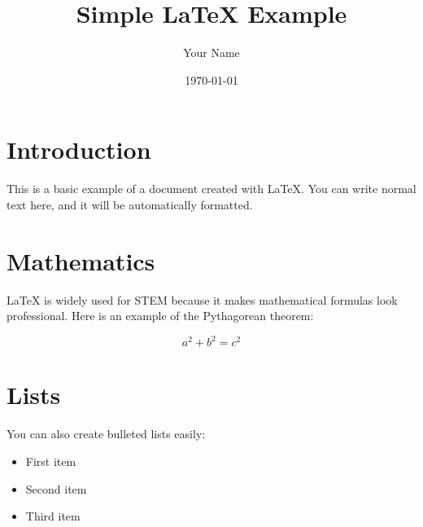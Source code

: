 \documentclass{article} %
\title{Simple LaTeX Example}
\author{Your Name}
\date{\today}
\begin{document}

\maketitle %

\section{Introduction}
This is a basic example of a document created with \LaTeX. You can write 
normal text here, and it will be automatically formatted.

\section{Mathematics}
LaTeX is widely used for STEM because it makes mathematical formulas look 
professional. Here is an example of the Pythagorean theorem:

\[ a^2 + b^2 = c^2 \]

\section{Lists}
You can also create bulleted lists easily:
\begin{itemize}
    \item First item
    \item Second item
    \item Third item
\end{itemize}
\end{document}
